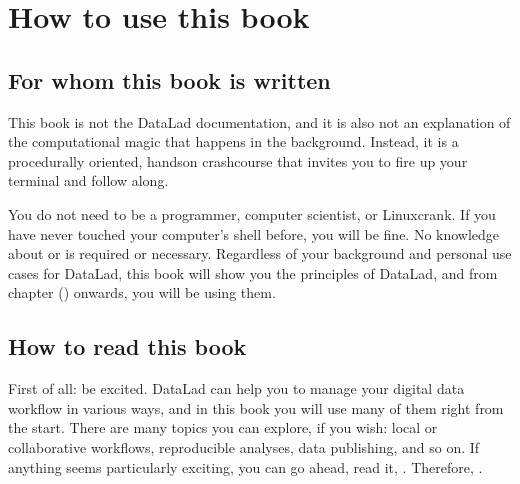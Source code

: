 \chapter{How to use this book}
\label{\detokenize{intro/narrative:how-to-use-this-book}}\label{\detokenize{intro/narrative::doc}}


\section{For whom this book is written}
\label{\detokenize{intro/narrative:for-whom-this-book-is-written}}
\sphinxAtStartPar
This book is not the DataLad documentation, and it is also
not an explanation of the computational magic that happens in the background.
Instead, it is a procedurally oriented, hands\sphinxhyphen{}on crash\sphinxhyphen{}course that invites
you to fire up your terminal and follow along.

\sphinxAtStartPar
{}

\sphinxAtStartPar
You do not need to be a programmer, computer scientist, or Linux\sphinxhyphen{}crank.
If you have never touched your computer’s shell before, you will be fine.
No knowledge about {\hyperref[\detokenize{glossary:term-Git}]{}} or {\hyperref[\detokenize{glossary:term-git-annex}]{}} is required or necessary.
Regardless of your background and personal use cases for DataLad, this
book will show you the principles of DataLad, and from chapter {\hyperref[\detokenize{basics/101-101-create:createds}]{}} () onwards,
you will be using them.


\section{How to read this book}
\label{\detokenize{intro/narrative:how-to-read-this-book}}
\sphinxAtStartPar
First of all: be excited. DataLad can help you to manage your digital data
workflow in various ways, and in this book you will use many of them right
from the start.
There are many topics you can explore, if you wish:
local or collaborative workflows, reproducible analyses, data publishing, and so on.
If anything seems particularly exciting, you can go ahead, read it, .
Therefore, .

